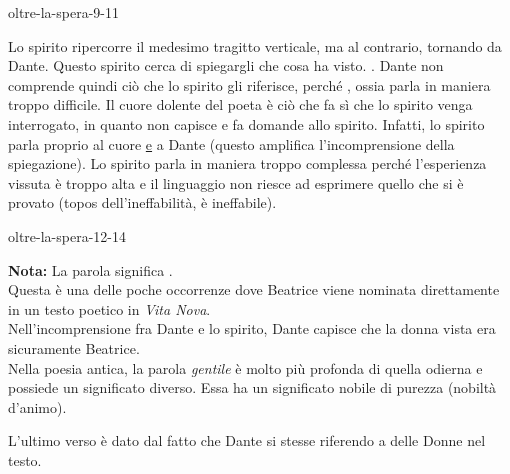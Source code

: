 \documentclass[preview]{standalone}
\begin{document}
\begin{snippet}{oltre-la-spera-9-11}

    Lo spirito ripercorre il medesimo tragitto verticale, ma al contrario, tornando da Dante.
    Questo spirito cerca di spiegargli che cosa ha visto.
    .
    Dante non comprende quindi ciò che lo spirito gli riferisce, perché
    , ossia parla in maniera troppo difficile.
    Il cuore dolente del poeta è ciò che fa sì che lo spirito venga interrogato, 
    in quanto non capisce e fa domande allo spirito.
    Infatti, lo spirito parla proprio al cuore \underline{e} a Dante (questo amplifica l'incomprensione della spiegazione).
    Lo spirito parla in maniera troppo complessa perché l'esperienza vissuta è troppo alta 
    e il linguaggio non riesce ad esprimere quello che si è provato (topos dell'ineffabilità, è ineffabile).
\end{snippet}

\begin{snippet}{oltre-la-spera-12-14}

    \textbf{\color{red}Nota:} La parola  significa . \\
    Questa è una delle poche occorrenze dove Beatrice viene nominata direttamente in un testo poetico in \textit{Vita Nova}.\\
    Nell'incomprensione fra Dante e lo spirito, Dante capisce che la donna vista era sicuramente
    Beatrice. \\
    Nella poesia antica, la parola \textit{gentile} è molto più profonda di quella odierna
    e possiede un significato diverso. Essa ha un significato nobile di purezza (nobiltà d'animo).
    
    L'ultimo verso è dato dal fatto che Dante si stesse riferendo a delle Donne nel testo.
\end{snippet}
\end{document}
